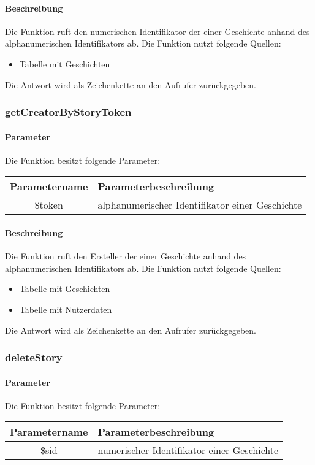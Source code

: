 \paragraph{Beschreibung} Die Funktion ruft den numerischen Identifikator der einer Geschichte anhand des alphanumerischen Identifikators ab. Die Funktion nutzt folgende Quellen:
\begin{itemize}
	\item Tabelle mit Geschichten
\end{itemize}
Die Antwort wird als Zeichenkette an den Aufrufer zurückgegeben.
\subsubsection{getCreatorByStoryToken}
\paragraph{Parameter} Die Funktion besitzt folgende Parameter:
\begin{table}[H]
	\begin{tabular}{|c|p{11cm}|}
		\hline
		\textbf{Parametername} & \textbf{Parameterbeschreibung} \\ \hline
		\$token & alphanumerischer Identifikator einer Geschichte \\ \hline
	\end{tabular}
\end{table}
\paragraph{Beschreibung} Die Funktion ruft den Ersteller der einer Geschichte anhand des alphanumerischen Identifikators ab. Die Funktion nutzt folgende Quellen:
\begin{itemize}
	\item Tabelle mit Geschichten
	\item Tabelle mit Nutzerdaten
\end{itemize}
Die Antwort wird als Zeichenkette an den Aufrufer zurückgegeben.
\subsubsection{deleteStory}
\paragraph{Parameter} Die Funktion besitzt folgende Parameter:
\begin{table}[H]
	\begin{tabular}{|c|p{11cm}|}
		\hline
		\textbf{Parametername} & \textbf{Parameterbeschreibung} \\ \hline
		\$sid & numerischer Identifikator einer Geschichte \\ \hline
	\end{tabular}
\end{table}
